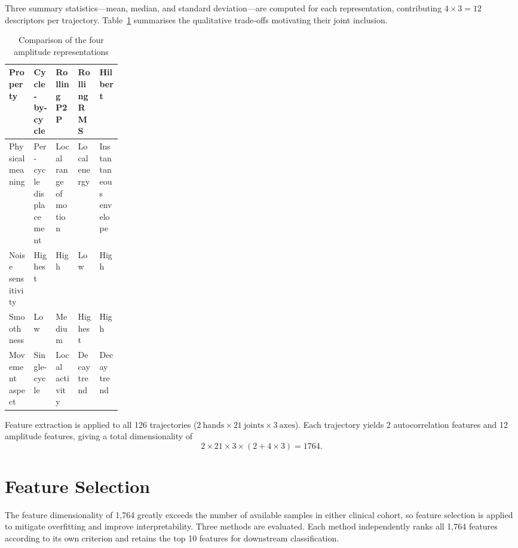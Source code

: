 Three summary statistics---mean, median, and standard deviation---are computed for each representation, contributing $4 \times 3 = 12$ descriptors per trajectory. Table~\ref{tab:amplitude_comparison} summarises the qualitative trade-offs motivating their joint inclusion.

\begin{table}[H]
    \centering
    \caption{Comparison of the four amplitude representations}
    \label{tab:amplitude_comparison}
    \small
    \setlength{\tabcolsep}{4pt}
    \begin{tabularx}{\linewidth}{>{\raggedright\arraybackslash}p{0.22\linewidth} >{\raggedright\arraybackslash}X >{\raggedright\arraybackslash}X >{\raggedright\arraybackslash}X >{\raggedright\arraybackslash}X}
        \toprule
        Property & Cycle-by-cycle & Rolling P2P & Rolling RMS & Hilbert \\
        \midrule
        Physical meaning   & Per-cycle displacement & Local range of motion & Local energy & Instantaneous envelope \\
        Noise sensitivity  & Highest                & High                  & Low          & High \\
        Smoothness         & Low                    & Medium                & Highest      & High \\
        Movement aspect    & Single-cycle           & Local activity        & Decay trend  & Decay trend \\
        \bottomrule
    \end{tabularx}
\end{table}

Feature extraction is applied to all 126 trajectories ($2~\text{hands} \times 21~\text{joints} \times 3~\text{axes}$). Each trajectory yields 2 autocorrelation features and 12 amplitude features, giving a total dimensionality of
\begin{equation}
    2 \times 21 \times 3 \times (2 + 4 \times 3) = 1764.
    \label{eq:feature_dim}
\end{equation}

\section{Feature Selection}
\label{sec:fs}

The feature dimensionality of 1,764 greatly exceeds the number of available samples in either clinical cohort, so feature selection is applied to mitigate overfitting and improve interpretability. Three methods are evaluated. Each method independently ranks all 1,764 features according to its own criterion and retains the top 10 features for downstream classification.

